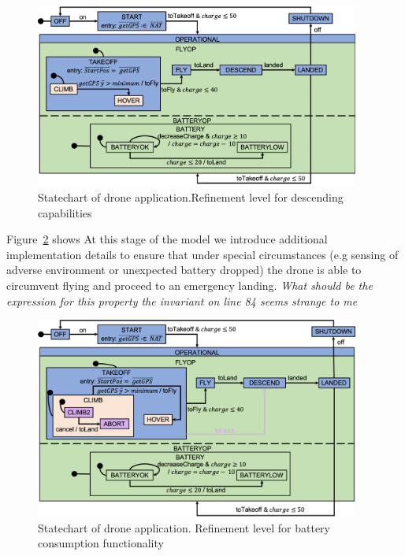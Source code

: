 \begin{figure}[!h]
	\centering
	\includegraphics[width=0.95\textwidth]{figures/Picture3.png}
	\caption{Statechart of drone application.Refinement level for descending capabilities}
	\label{fig:drone3}
\end{figure} 

Figure~\ref{fig:drone4} shows
At this stage of the model we introduce additional implementation details to ensure that under special 
circumstances (e.g sensing of adverse environment or unexpected battery dropped) the drone is able 
to circumvent flying and proceed to an emergency landing. 
\emph{What should be the expression for this property the invariant on line 84 seems strange to me}

\begin{figure}[!h]
	\centering
	\includegraphics[width=0.95\textwidth]{figures/Picture5.png}
	\caption{Statechart of drone application. Refinement level for battery consumption functionality}
	\label{fig:drone4}
\end{figure} 

